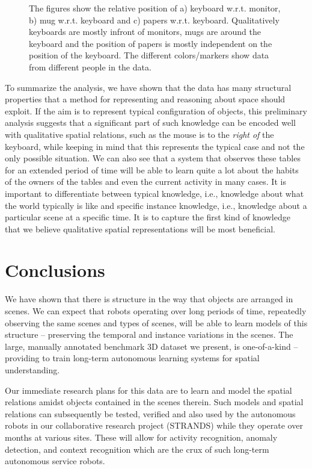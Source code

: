 \documentclass[letterpaper, 10 pt, conference]{ieeeconf}
\begin{document}
\begin{figure}[t]
\begin{center}
\end{center}
\caption{The figures show the relative position of a) keyboard w.r.t. monitor, b) mug w.r.t. keyboard and c) papers w.r.t. keyboard. Qualitatively keyboards are mostly infront of monitors, mugs are around the keyboard and the position of papers is mostly independent on the position of the keyboard. The different colors/markers show data from different people in the data.} 
\label{fig:scatter-rest}
\end{figure}

To summarize the analysis, we have shown that the data has many structural 
properties that a method for representing and reasoning about 
space should exploit. If the aim is to represent typical configuration of 
objects, this preliminary analysis suggests that a significant 
part of such knowledge can be encoded well with qualitative spatial 
relations, such as the mouse is to the \textit{right of} the keyboard, while 
keeping in mind that this represents the typical case and not the only 
possible situation. We can also see that a system that observes these tables for 
an extended period of time will be able to learn quite a lot about the 
habits of the owners of the tables and even the current activity in 
many cases. It is important to differentiate between typical knowledge, 
i.e., knowledge about what the world typically is like and specific 
instance knowledge, i.e., knowledge about a particular scene at a specific 
time. It is to capture the first kind of knowledge that we 
believe  qualitative spatial representations will be most beneficial. 

\section{Conclusions}
\label{sec:Conclusions}

We have shown that there is structure in the way that objects are
arranged in scenes.  We can expect that robots operating over long periods 
of time, repeatedly observing the same scenes and types of scenes, 
will be able to learn models of this structure -- preserving the temporal 
and instance variations in the scenes. 
The large, manually annotated benchmark 3D dataset we present, is one-of-a-kind -- 
providing to train long-term autonomous learning systems for spatial understanding.

Our immediate research plans for this data are to learn and model the spatial relations amidst objects contained in the scenes therein. Such models and spatial relations can subsequently be tested, verified and also used by the autonomous robots in our collaborative research project (STRANDS) while they operate over months at various sites.  These will
allow for activity recognition, anomaly detection, and context recognition which are the crux of such long-term autonomous service robots.
\end{document}

